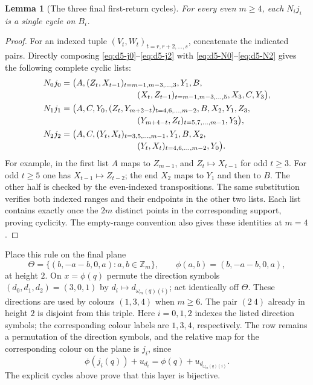 \documentclass[11pt,reqno]{amsart}
\numberwithin{equation}{section}
\newtheorem{lemma}[theorem]{Lemma}
\theoremstyle{definition}
\theoremstyle{remark}
\newcommand{\Zm}{\mathbb Z_m}
\begin{document}
\begin{lemma}[The three final first-return cycles]\label{lem:d5-endpoint}
For every even $m\ge4$, each $N_i j_i$ is a single cycle on $B_i$.
\end{lemma}
\begin{proof}
For an indexed tuple $(V_t,W_t)_{t=r,r+2,\ldots,s}$, concatenate the indicated
pairs. Directly composing \eqref{eq:d5-j0}--\eqref{eq:d5-j2} with
\eqref{eq:d5-N0}--\eqref{eq:d5-N2} gives the following complete cyclic lists:
\begin{align}
 N_0j_0={}&\bigl(A,
 (Z_t,X_{t-1})_{t=m-1,m-3,\ldots,3},Y_1,B,\notag\\[-2pt]
 &\hspace{27mm}(X_t,Z_{t-1})_{t=m-1,m-3,\ldots,5},X_3,C,Y_3\bigr),\label{eq:d5-end0}\\
 N_1j_1={}&\bigl(A,C,Y_0,
 (Z_t,Y_{m+2-t})_{t=4,6,\ldots,m-2},B,X_2,Y_1,Z_3,\notag\\[-2pt]
 &\hspace{27mm}(Y_{m+4-t},Z_t)_{t=5,7,\ldots,m-1},Y_3\bigr),\label{eq:d5-end1}\\
 N_2j_2={}&\bigl(A,C,(Y_t,X_t)_{t=3,5,\ldots,m-1},Y_1,B,X_2,\notag\\[-2pt]
 &\hspace{27mm}(Y_t,X_t)_{t=4,6,\ldots,m-2},Y_0\bigr).\label{eq:d5-end2}
\end{align}
For example, in the first list $A$ maps to $Z_{m-1}$, and
$Z_t\mapsto X_{t-1}$ for odd $t\ge3$. For odd $t\ge5$ one has
$X_{t-1}\mapsto Z_{t-2}$; the end $X_2$ maps to $Y_1$ and then to $B$.
The other half is checked by the even-indexed transpositions. The same
substitution verifies both indexed ranges and their endpoints in the other two
lists. Each list contains exactly once the $2m$ distinct points in the
corresponding support, proving cyclicity. The empty-range convention also gives
these identities at $m=4$.
\end{proof}

Place this rule on the final plane
\[
 \Theta=\{(b,-a-b,0,a):a,b\in\Zm\},\qquad
 \phi(a,b)=(b,-a-b,0,a),
\]
at height $2$. On $x=\phi(q)$ permute the direction symbols
$(d_0,d_1,d_2)=(3,0,1)$ by $d_i\mapsto d_{\omega_m(q)(i)}$; act identically off
$\Theta$. These directions are used by colours $(1,3,4)$ when $m\ge6$.
The pair $(2\ 4)$ already in height $2$ is disjoint from this triple.
Here $i=0,1,2$ indexes the listed direction symbols; the corresponding
colour labels are $1,3,4$, respectively. The row remains a permutation
of the direction symbols, and the relative map for the corresponding
colour on the plane is $j_i$, since
\begin{equation}\label{eq:d5-head}
 \phi(j_i(q))+u_{d_i}=\phi(q)+u_{d_{\omega_m(q)(i)}}.
\end{equation}
The explicit cycles above prove that this layer is bijective.
\end{document}
